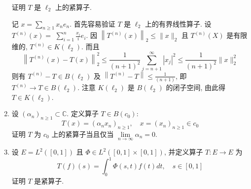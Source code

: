 \begin{enumerate}
\[    \]
    证明 $T$ 是 $\ell_{2}$ 上的紧算子.
        \begin{answer}
            记 $x=\sum_{n \geq 1} x_{n} e_{n}$. 首先容易验证 $T$ 是 $\ell_{2}$ 上的有界线性算子. 设 $T^{(n)}(x)=$ $\sum_{i=1}^{n} \frac{x_{i}}{i} e_{i}$. 因 $\left\|T^{(n)}(x)\right\|_{2} \leq\|x\|_{2}$ 且 $T^{(n)}(X)$ 是有限维的, $T^{(n)} \in K\left(\ell_{2}\right)$. 而且
            \[
                \left\|T^{(n)}(x)-T(x)\right\|_{2}^{2} \leq \frac{1}{(n+1)^{2}} \sum_{j=n+1}^{\infty}\left|x_{j}\right|^{2} \leq \frac{1}{(n+1)^{2}}\|x\|_{2}^{2}
            \]
            则有 $T^{(n)}-T \in B\left(\ell_{2}\right)$ 及 $\left\|T^{(n)}-T\right\| \leq \frac{1}{(n+1)}$, 即 $T^{(n)} \rightarrow T \in B\left(\ell_{2}\right)$. 注意 $K\left(\ell_{2}\right)$ 是 $B\left(\ell_{2}\right)$ 的闭子空间, 由此得 $T \in K\left(\ell_{2}\right)$.
        \end{answer}
    \item 设 $\left(\alpha_{n}\right)_{n \geq 1} \subset \mathbb{C} .$ 定义算子 $T \in B\left(c_{0}\right):$
    \[
    T(x)=\left(\alpha_{n} x_{n}\right)_{n \geq 1}, \quad x=\left(x_{n}\right)_{n \geq 1} \in c_{0}
    \]
    证明 $T$ 为 $c_{0}$ 上的紧算子当且仅当 $\lim \limits_{n \to \infty} \alpha_{n}=0$.
        \begin{answer}
        \end{answer}
    \item 设 $E=L^{2}([0,1])$ 且 $\Phi \in L^{2}([0,1] \times[0,1])$, 并定义算子 $T: E \rightarrow E$ 为
    \[
    T(f)(s)=\int_{0}^{1} \Phi(s, t) f(t) d t, \quad s \in[0,1]
    \]
    证明 $T$ 是紧算子.
        \begin{answer}
\end{answer}
\end{enumerate}
